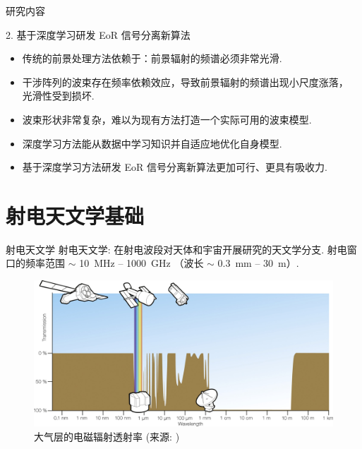 \documentclass{beamer}
\newcommand{\citeay}[1]{\citeauthor{#1} \citeyear{#1} \parencite{#1}}
\begin{document}
\begin{frame}{研究内容}
  \begin{alertblock}{2. 基于深度学习研发 EoR 信号分离新算法}
    \begin{itemize}
      \item 传统的前景处理方法依赖于：前景辐射的频谱必须非常光滑.
      \item 干涉阵列的波束存在频率依赖效应，导致前景辐射的频谱出现小尺度涨落，
        光滑性受到损坏.
      \item 波束形状非常复杂，难以为现有方法打造一个实际可用的波束模型.
      \item 深度学习方法能从数据中学习知识并自适应地优化自身模型.
      \item 基于深度学习方法研发 EoR 信号分离新算法更加可行、更具有吸收力.
    \end{itemize}
  \end{alertblock}
\end{frame}


\section{射电天文学基础}

\begin{frame}{射电天文学}
  \alert{射电天文学}:
  在射电波段对天体和宇宙开展研究的天文学分支.
  \alert{射电窗口}的频率范围 $\sim$ \SI{10}{\MHz} -- \SI{1000}{\GHz}
  （波长 $\sim$ \SI{0.3}{\mm} -- \SI{30}{\meter}）.

  \begin{figure}
    \centering
    \includegraphics[width=\textwidth]{atmospheric-em-transmittance}
    \caption{大气层的电磁辐射透射率 (来源: \citeay{condon2016})}
  \end{figure}
\end{frame}
\end{document}
